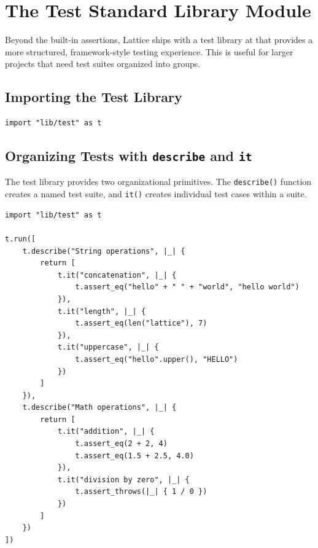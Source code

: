 \section{The Test Standard Library Module}\label{sec:test-stdlib}

Beyond the built-in assertions, Lattice ships with a test library at  that provides a more structured, framework-style testing experience.
This is useful for larger projects that need test suites organized into groups.

\subsection{Importing the Test Library}\label{sec:test-import}

\begin{lstlisting}[language=Lattice, caption={Importing the test library}]
import "lib/test" as t
\end{lstlisting}

\subsection{Organizing Tests with \texttt{describe} and \texttt{it}}\label{sec:describe-it}

The test library provides two organizational primitives.
The \lstinline|describe()| function creates a named test suite, and \lstinline|it()| creates individual test cases within a suite.

\begin{lstlisting}[language=Lattice, caption={Structured test suites}]
import "lib/test" as t

t.run([
    t.describe("String operations", |_| {
        return [
            t.it("concatenation", |_| {
                t.assert_eq("hello" + " " + "world", "hello world")
            }),
            t.it("length", |_| {
                t.assert_eq(len("lattice"), 7)
            }),
            t.it("uppercase", |_| {
                t.assert_eq("hello".upper(), "HELLO")
            })
        ]
    }),
    t.describe("Math operations", |_| {
        return [
            t.it("addition", |_| {
                t.assert_eq(2 + 2, 4)
                t.assert_eq(1.5 + 2.5, 4.0)
            }),
            t.it("division by zero", |_| {
                t.assert_throws(|_| { 1 / 0 })
            })
        ]
    })
])
\end{lstlisting}

